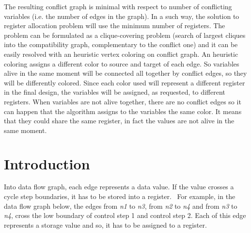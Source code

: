 The resulting conflict graph is minimal with respect to number of conflicting variables (i.\+e. the number of edges in the graph). In a such way, the solution to register allocation problem will use the minimum number of registers. The problem can be formulated as a clique-\/covering problem (search of largest cliques into the compatibility graph, complementary to the conflict one) and it can be easily resolved with an heuristic vertex coloring on conflict graph. An heuristic coloring assigns a different color to source and target of each edge. So variables alive in the same moment will be connected all together by conflict edges, so they will be differently colored. Since each color used will represent a different register in the final design, the variables will be assigned, as requested, to different registers. When variables are not alive together, there are no conflict edges so it can happen that the algorithm assigns to the variables the same color. It means that they could share the same register, in fact the values are not alive in the same moment.\hypertarget{PandA_DOC_intro}{}\section{Introduction}\label{PandA_DOC_intro}
Into data flow graph, each edge represents a data value. If the value crosses a cycle step boundaries, it has to be stored into a register.~\newline
 For example, in the data flow graph below, the edges from {\itshape n1} to {\itshape n3}, from {\itshape n2} to {\itshape n4} and from {\itshape n3} to {\itshape n4}, cross the low boundary of control step 1 and control step 2. Each of this edge represents a storage value and so, it has to be assigned to a register. 
